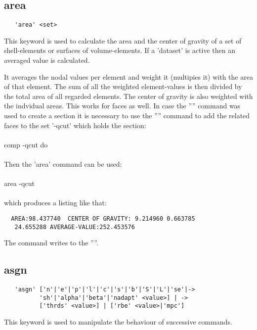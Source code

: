 \documentclass{article}
\begin{document}
\subsection{\label{area}area}
\begin{verbatim}
   'area' <set> 
\end{verbatim}
This keyword is used to calculate the area and the center of gravity of a set of shell-elements or surfaces of volume-elements. If a 'dataset' is active then an averaged value is calculated.

It averages the nodal values per element and weight it (multipies it) with the area of that element. The sum of all the weighted element-values is then divided by the total area of all regarded elements. The center of gravity is also weighted with the indvidual areas. This works for faces as well. In case the '''' command was used to create a section it is necessary to use the '''' command to add the related faces to the set '-qcut' which holds the section:\\\\comp -qcut do\\\\Then the 'area' command can be used:\\\\area -qcut\\\\which produces a listing like that:
\begin{verbatim}
  AREA:98.437740  CENTER OF GRAVITY: 9.214960 0.663785
   24.655288 AVERAGE-VALUE:252.453576
\end{verbatim}

The command writes to the ''''.

\subsection{\label{asgn}asgn}
\begin{verbatim}
   'asgn' ['n'|'e'|'p'|'l'|'c'|'s'|'b'|'S'|'L'|'se'|->
          'sh'|'alpha'|'beta'|'nadapt' <value>] | ->
          ['thrds' <value>] | ['rbe' <value>|'mpc']
\end{verbatim}
This keyword is used to manipulate the behaviour of successive commands.
\end{document}
